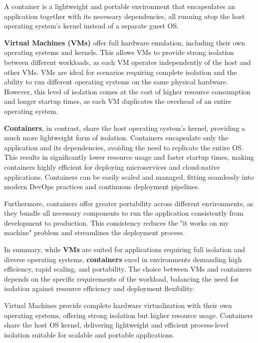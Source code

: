 \begin{definitionblock}[Container]
A container is a lightweight and portable environment that encapsulates an application together with its necessary dependencies, all running atop the host operating system’s kernel instead of a separate guest OS.
\end{definitionblock}

\textbf{Virtual Machines (VMs)} offer full hardware emulation, including their own operating systems and kernels. This allows VMs to provide strong isolation between different workloads, as each VM operates independently of the host and other VMs. VMs are ideal for scenarios requiring complete isolation and the ability to run different operating systems on the same physical hardware. However, this level of isolation comes at the cost of higher resource consumption and longer startup times, as each VM duplicates the overhead of an entire operating system.

\textbf{Containers}, in contrast, share the host operating system's kernel, providing a much more lightweight form of isolation. Containers encapsulate only the application and its dependencies, avoiding the need to replicate the entire OS. This results in significantly lower resource usage and faster startup times, making containers highly efficient for deploying microservices and cloud-native applications. Containers can be easily scaled and managed, fitting seamlessly into modern DevOps practices and continuous deployment pipelines.

Furthermore, containers offer greater portability across different environments, as they bundle all necessary components to run the application consistently from development to production. This consistency reduces the "it works on my machine" problem and streamlines the deployment process.

In summary, while \textbf{VMs} are suited for applications requiring full isolation and diverse operating systems, \textbf{containers} excel in environments demanding high efficiency, rapid scaling, and portability. The choice between VMs and containers depends on the specific requirements of the workload, balancing the need for isolation against resource efficiency and deployment flexibility.

\begin{definitionblock}
Virtual Machines provide complete hardware virtualization with their own operating systems, offering strong isolation but higher resource usage. Containers share the host OS kernel, delivering lightweight and efficient process-level isolation suitable for scalable and portable applications.
\end{definitionblock}

